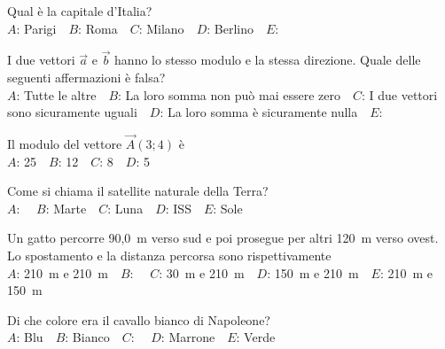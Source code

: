 \mcquestionfooter



\mcpaperfooter

\def\mcserialnumber{29}
\mcpaperheader


\def\mcquestionnumber{1}


\mcquestionheader Qual è la capitale d’Italia?\\
{$A$}: Parigi\ \ {$B$}: Roma\ \ {$C$}: Milano\ \ {$D$}: Berlino\ \ {$E$}: \ \ 

\mcquestionfooter



\def\mcquestionnumber{2}


\mcquestionheader I due vettori $\vec{a}$ e $\vec{b}$ hanno lo stesso modulo e la stessa direzione. Quale delle seguenti affermazioni è falsa?\\
{$A$}: Tutte le altre\ \ {$B$}: La loro somma non può mai essere zero\ \ {$C$}: I due vettori sono sicuramente uguali\ \ {$D$}: La loro somma è sicuramente nulla\ \ {$E$}: \ \ 

\mcquestionfooter



\def\mcquestionnumber{3}


\mcquestionheader Il modulo del vettore $\vec{A}(3;4)$ è\\
{$A$}: 25\ \ {$B$}: 12\ \ {$C$}: 8\ \ {$D$}: 5\ \ 

\mcquestionfooter



\def\mcquestionnumber{4}


\mcquestionheader Come si chiama il satellite naturale della Terra?\\
{$A$}: \ \ {$B$}: Marte\ \ {$C$}: Luna\ \ {$D$}: ISS\ \ {$E$}: Sole\ \ 

\mcquestionfooter



\def\mcquestionnumber{5}


\mcquestionheader Un gatto percorre 90,0~m verso sud e poi prosegue per altri 120~m verso ovest. Lo spostamento e la distanza percorsa sono rispettivamente\\
{$A$}: 210~m e 210~m\ \ {$B$}: \ \ {$C$}: 30~m e 210~m\ \ {$D$}: 150~m e 210~m\ \ {$E$}: 210~m e 150~m\ \ 

\mcquestionfooter



\def\mcquestionnumber{6}


\mcquestionheader Di che colore era il cavallo bianco di Napoleone?\\
{$A$}: Blu\ \ {$B$}: Bianco\ \ {$C$}: \ \ {$D$}: Marrone\ \ {$E$}: Verde\ \ 

